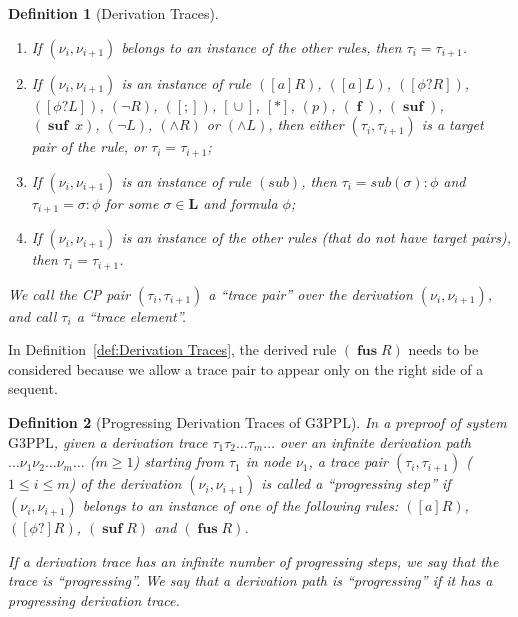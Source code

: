 \documentclass[manuscript,screen]{acmart}
\newtheorem{definition}{Definition}[section]
\newcommand{\bff}[1]{\mathbf{#1}}
\newcommand{\Conf}[0]{\bff{L}}
\DeclareMathOperator{\seq}{;}
\DeclareMathOperator{\cho}{\cup}
\newcommand{\Sub}[0]{{\textit{sub}}}
\newcommand{\lup}[0]{*}
\newcommand{\GiiiPPLcyc}[0]{\mbox{G3PPL}}
\DeclareMathOperator{\ofst}{\mathbf{f}}
\DeclareMathOperator{\osuf}{\mathbf{suf}}
\DeclareMathOperator{\ofus}{\mathbf{fus}}
\begin{document}
\begin{definition}[Derivation Traces]
\begin{enumerate}
        \item If $(\nu_i, \nu_{i+1})$ belongs to an instance of the other rules, 
        then $\tau_i = \tau_{i+1}$. 

        \ifx
        \item If $(\nu_i, \nu_{i+1})$ is an instance of rule $([a]R)$,  $([a]L)$, $([\phi?R])$, $([\phi?L])$, $(\neg R)$, $([\seq])$, $[\cho]$, $[\lup]$, $(p)$, $(\ofst)$, $(\osuf)$, $(\osuf\ x)$, $(\neg L)$, $(\wedge R)$ or $(\wedge L)$, 
        then either $(\tau_i, \tau_{i+1})$ is a target pair of the rule, or $\tau_i = \tau_{i+1}$;

        \item If $(\nu_i, \nu_{i+1})$ is an instance of rule $(\Sub)$, 
        then $\tau_i = \Sub(\sigma) : \phi$ and $\tau_{i+1} = \sigma : \phi$ for some $\sigma\in \Conf$ and formula $\phi$;
        
        \item If $(\nu_i, \nu_{i+1})$ is an instance of the other rules (that do not have target pairs), 
        then $\tau_i = \tau_{i+1}$. 
        \fi
    \end{enumerate}
    We call the CP pair $(\tau_i, \tau_{i+1})$ a ``trace pair'' over the derivation $(\nu_i, \nu_{i+1})$, and call $\tau_i$ a ``trace element''. 
\end{definition}

In Definition~\ref{def:Derivation Traces}, the derived rule $(\ofus R)$ needs to be considered because we allow a trace pair to appear only on the right side of a sequent. 

\begin{definition}[Progressing Derivation Traces of \GiiiPPLcyc]
\label{def:progressing Step/progressing Derivation Trace of GiiiPPLcyc}
In a preproof of system $\GiiiPPLcyc$, given a derivation trace $\tau_1\tau_2\ldots\tau_m\ldots$ over an infinite derivation path $\ldots\nu_1\nu_2\ldots\nu_m\ldots$ ($m\ge 1$) starting from $\tau_1$ in node $\nu_1$, 
a trace pair $(\tau_i, \tau_{i+1})$ ($1\le i\le m$) of the derivation $(\nu_i, \nu_{i+1})$ is called a ``progressing step'' if $(\nu_i, \nu_{i+1})$ belongs to an instance of one of the following rules: 
$([a]R)$, $([\phi?]R)$, $(\osuf R)$ and $(\ofus R)$. 

If a derivation trace has an infinite number of progressing steps, we say that the trace is ``progressing''. 
We say that a derivation path is ``progressing'' if it has a progressing derivation trace. 
\end{definition}
\end{document}
